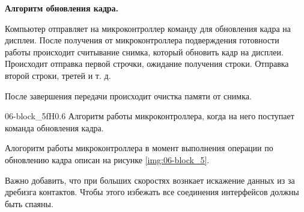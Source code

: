 	\textbf{Алгоритм обновления кадра.}
	
	Компьютер отправляет на микроконтроллер команду для обновления кадра на дисплеи. После получения от микроконтроллера подверждения готовности работы происходит считывание снимка, который обновить кадр на дисплеи. Происходит отправка первой строчки, ожидание получения строки. Отправка второй строки, третей и т. д.
	
	После завершения передачи происходит очистка памяти от снимка.
	
	{06-block_5}{f}{H}{0.6\textwidth}
	{Алгоритм работы микроконтроллера, когда на него поступает команда обновления кадра.} %
	
	Алогоритм работы микроконтроллера в момент выполнения операции по обновлению кадра описан на рисунке \ref{img:06-block_5}.
	
	Важно добавить, что при больших скоростях вознкает искажение данных из за дребизга контактов. Чтобы этого избежать все соединения интерфейсов должны быть спаяны.
	
	